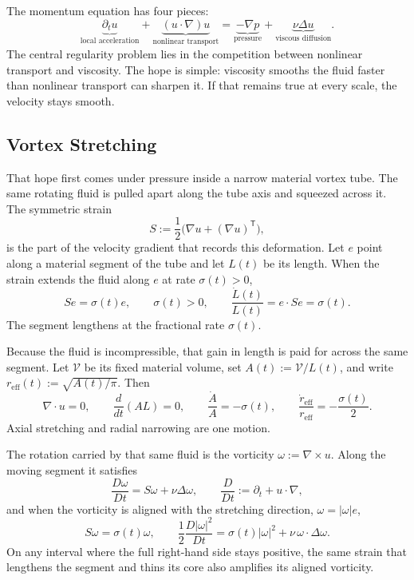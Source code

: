 
The momentum equation has four pieces:
\[
  \underbrace{\partial_t u}_{\text{local acceleration}}
  +
  \underbrace{(u\cdot\nabla)u}_{\text{nonlinear transport}}
  =
  \underbrace{-\nabla p}_{\text{pressure}}
  +
  \underbrace{\nu\Delta u}_{\text{viscous diffusion}}.
\]
The central regularity problem lies in the competition between nonlinear transport and viscosity.
The hope is simple: viscosity smooths the fluid faster than nonlinear transport can sharpen it.
If that remains true at every scale, the velocity stays smooth.

\subsection{Vortex Stretching}\label{sub:ThePerfectlyStretchingVortex}

That hope first comes under pressure inside a narrow material vortex tube. The same rotating fluid is pulled apart along the tube axis and squeezed across it. The symmetric strain
\[
  S:=\frac12\bigl(\nabla u+(\nabla u)^{\mathsf T}\bigr),
\]
is the part of the velocity gradient that records this deformation. Let \(e\) point along a material segment of the tube and let \(L(t)\) be its length. When the strain extends the fluid along \(e\) at rate \(\sigma(t)>0\),
\[
  Se=\sigma(t)e,
  \qquad
  \sigma(t)>0,
  \qquad
  \frac{\dot L(t)}{L(t)}
  =
  e\cdot Se
  =
  \sigma(t).
\]
The segment lengthens at the fractional rate \(\sigma(t)\).

Because the fluid is incompressible, that gain in length is paid for across the same segment. Let \(\mathcal V\) be its fixed material volume, set \(A(t):=\mathcal V/L(t)\), and write \(r_{\mathrm{eff}}(t):=\sqrt{A(t)/\pi}\). Then
\[
  \nabla\cdot u=0,
  \qquad
  \frac{d}{dt}(A L)=0,
  \qquad
  \frac{\dot A}{A}=-\sigma(t),
  \qquad
  \frac{\dot r_{\mathrm{eff}}}{r_{\mathrm{eff}}}
  =
  -\frac{\sigma(t)}{2}.
\]
Axial stretching and radial narrowing are one motion.

The rotation carried by that same fluid is the vorticity \(\omega:=\nabla\times u\). Along the moving segment it satisfies
\[
  \frac{D\omega}{Dt}
  =
  S\omega+\nu\Delta\omega,
  \qquad
  \frac{D}{Dt}
  :=
  \partial_t+u\cdot\nabla,
\]
and when the vorticity is aligned with the stretching direction, \(\omega=|\omega|e\),
\[
  S\omega
  =
  \sigma(t)\omega,
  \qquad
  \frac12\frac{D|\omega|^2}{Dt}
  =
  \sigma(t)|\omega|^2
  +
  \nu\,\omega\cdot\Delta\omega.
\]
On any interval where the full right-hand side stays positive, the same strain that lengthens the segment and thins its core also amplifies its aligned vorticity.

